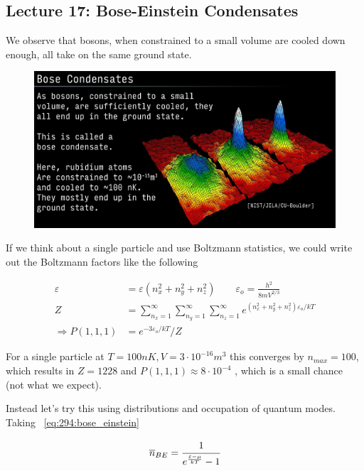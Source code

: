\documentclass[10pt]{article}
\begin{document}
\subsection{Lecture 17: Bose-Einstein Condensates}


We observe that bosons, when constrained to a small volume are cooled down enough, all take on the same ground state.

\begin{figure}[H]
	\centering
	\includegraphics[width=0.8\linewidth]{img/image_2022-04-11-12-19-42.png}
\end{figure}



If we think about a single particle and use Boltzmann statistics, we could write out the Boltzmann factors like the following


\begin{equation}
	\begin{split}
		\varepsilon  &= \varepsilon(n^2_x + n^2_y + n^2_z ) \qquad \varepsilon_o = \frac{h^2}{8mV^{2 /3}} \\
		Z &= \sum^\infty_{n_x = 1} \sum^\infty_{n_y = 1} \sum^\infty_{n_z = 1} e^{(n^2_x + n^2_y + n^2_z ) \varepsilon_o / kT} \\
		\Rightarrow P(1,1,1) &= e^{-3\varepsilon_o /kT}/Z
	\end{split}
\end{equation}

For a single particle at $ T = 100nK, V = 3 \cdot 10^{-16} m^3 $ this converges by $ n_{max} = 100 $, which results in $ Z = 1228 $  and $ P(1,1,1) \approx  8 \cdot  10 ^{-4} $ , which is a small chance (not what we expect).


Instead let's try this using distributions and occupation of quantum modes.
Taking ~\ref{eq:294:bose_einstein}


\begin{equation}
		\overline{n}_{BE} = \cfrac{1}{e^{\frac{\varepsilon - \mu}{kT}} - 1}
\end{equation}
\end{document}
